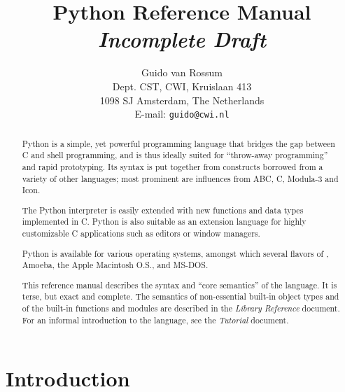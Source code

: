  

\title{\bf
	Python Reference Manual \\
	{\em Incomplete Draft}
}
	
\author{
	Guido van Rossum \\
	Dept. CST, CWI, Kruislaan 413 \\
	1098 SJ Amsterdam, The Netherlands \\
	E-mail: {\tt guido@cwi.nl}
}




\maketitle

\begin{abstract}

\noindent
Python is a simple, yet powerful programming language that bridges the
gap between C and shell programming, and is thus ideally suited for
``throw-away programming''
and rapid prototyping.  Its syntax is put
together from constructs borrowed from a variety of other languages;
most prominent are influences from ABC, C, Modula-3 and Icon.

The Python interpreter is easily extended with new functions and data
types implemented in C.  Python is also suitable as an extension
language for highly customizable C applications such as editors or
window managers.

Python is available for various operating systems, amongst which
several flavors of {\UNIX}, Amoeba, the Apple Macintosh O.S.,
and MS-DOS.

This reference manual describes the syntax and ``core semantics'' of
the language.  It is terse, but exact and complete.  The semantics of
non-essential built-in object types and of the built-in functions and
modules are described in the {\em Library Reference} document.  For an
informal introduction to the language, see the {\em Tutorial}
document.

\end{abstract}

\pagebreak

\tableofcontents

\pagebreak


\chapter{Introduction}


